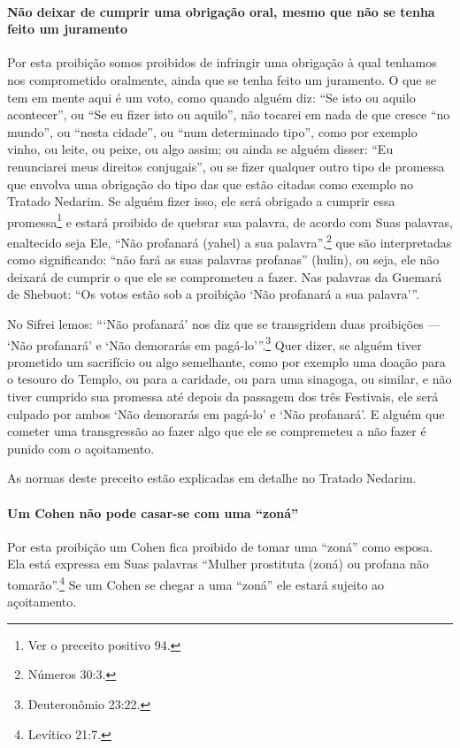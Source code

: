 \paragraph{Não deixar de cumprir uma obrigação oral, mesmo que não se tenha
feito um juramento}

Por esta proibição somos proibidos de infringir uma obrigação à qual
tenhamos nos comprometido oralmente, ainda que se tenha feito um
juramento. O que se tem em mente aqui é um voto, como quando alguém
diz: ``Se isto ou aquilo acontecer'', ou ``Se eu fizer isto ou aquilo'',
não tocarei em nada de que cresce ``no mundo'', ou ``nesta cidade'', ou
``num determinado tipo'', como por exemplo vinho, ou leite, ou peixe, ou algo assim; ou ainda se alguém
disser: ``Eu renunciarei meus direitos conjugais'', ou se fizer
qualquer outro tipo de promessa que envolva uma obrigação do tipo das
que estão citadas como exemplo no Tratado Nedarim. Se alguém fizer isso,
ele será obrigado a cumprir essa promessa\footnote{Ver o preceito positivo 94.} e estará
proibido de quebrar sua palavra, de acordo com Suas palavras, enaltecido
seja Ele, ``Não profanará (yahel) a sua palavra'',\footnote{Números 30:3.} que
são interpretadas como significando: ``não fará as suas palavras
profanas'' (hulin), ou seja, ele não deixará de cumprir o que ele se
comprometeu a fazer. Nas palavras da Guemará de Shebuot: ``Os votos
estão sob a proibição `Não profanará a sua palavra'''.

No Sifrei lemos: ```Não profanará' nos diz que se transgridem duas
proibições --- `Não profanará' e `Não demorarás em pagá-lo'''.\footnote{Deuteronômio 23:22.} Quer dizer, se alguém tiver prometido um
sacrifício ou algo semelhante, como por exemplo uma doação para o
tesouro do Templo, ou para a caridade, ou para uma sinagoga, ou similar,
e não tiver cumprido sua promessa até depois da passagem dos três
Festivais, ele será culpado por ambos `Não demorarás em pagá-lo' e `Não
profanará'. E alguém que cometer uma transgressão ao fazer algo que ele
se compremeteu a não fazer é punido com o açoitamento.

As normas deste preceito estão explicadas em detalhe no Tratado Nedarim.

\paragraph{Um Cohen não pode casar-se com uma ``zoná''}

Por esta proibição um Cohen fica proibido de tomar uma ``zoná'' como
esposa. Ela está expressa em Suas palavras ``Mulher prostituta (zoná) ou
profana não tomarão''.\footnote{Levítico 21:7.} Se um Cohen se chegar a uma
``zoná'' ele estará sujeito ao açoitamento.

